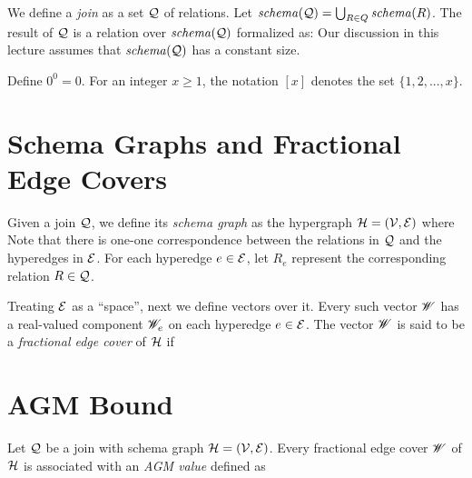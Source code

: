 We define a {\em join} as a set $\mathcal{Q}$ of relations. Let $\mathit{schema}(\mathcal{Q}) = \bigcup_{R \in Q} \mathit{schema}(R)$. The result of $\mathcal{Q}$ is a relation over $\mathit{schema}(\mathcal{Q})$ formalized as:
Our discussion in this lecture assumes that $\mathit{schema}(\mathcal{Q})$ has a constant size.

 Define $0^0 = 0$. For an integer $x \ge 1$, the notation $[x]$ denotes the set $\{1, 2, ..., x\}$.



\section{Schema Graphs and Fractional Edge Covers} \label{sec:schema}

Given a join $\mathcal{Q}$, we define its {\em schema graph} as the hypergraph $\mathcal{H} = (\mathcal{V}, \mathcal{E})$ where
Note that there is one-one correspondence between the relations in $\mathcal{Q}$ and the hyperedges in $\mathcal{E}$. For each hyperedge $e \in \mathcal{E}$, let $R_e$ represent the corresponding relation $R \in \mathcal{Q}$.

\vgap

Treating $\mathcal{E}$ as a ``space'', next we define vectors over it. Every such vector $\mathscr{W}$ has a real-valued component $\mathscr{W}_e$ on each hyperedge $e \in \mathcal{E}$. The vector $\mathscr{W}$ is said to be a {\em fractional edge cover} of $\mathcal{H}$ if

\section{AGM Bound} \label{sec:agm}

Let $\mathcal{Q}$ be a join with schema graph $\mathcal{H} = (\mathcal{V}, \mathcal{E})$. Every fractional edge cover $\mathscr{W}$ of $\mathcal{H}$ is associated with an {\em AGM value} defined as

\vgap

